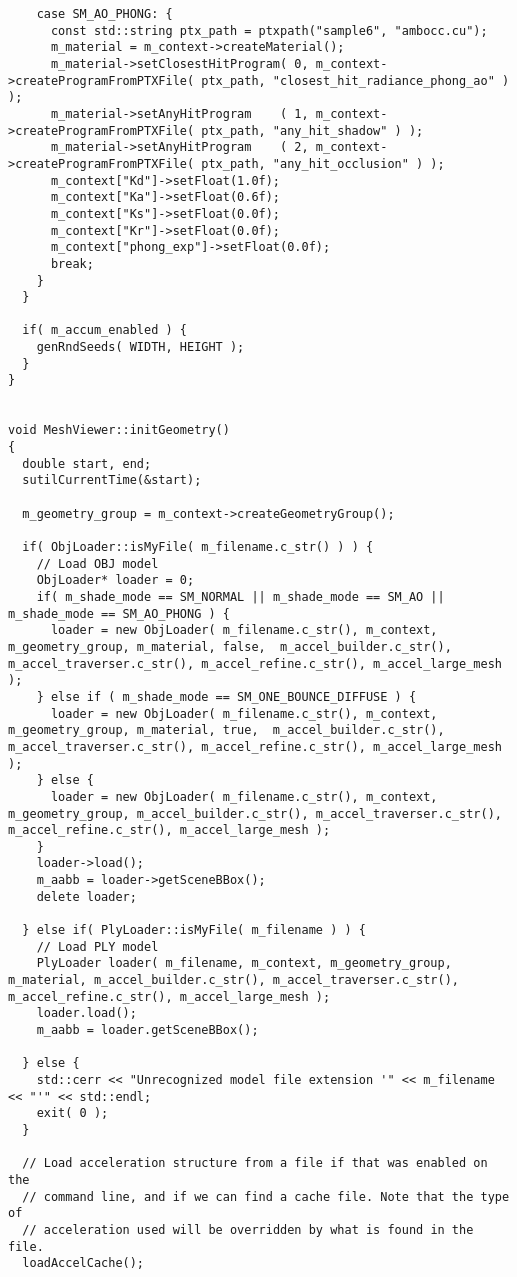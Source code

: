 \begin{verbatim}
    case SM_AO_PHONG: {
      const std::string ptx_path = ptxpath("sample6", "ambocc.cu");
      m_material = m_context->createMaterial();
      m_material->setClosestHitProgram( 0, m_context->createProgramFromPTXFile( ptx_path, "closest_hit_radiance_phong_ao" ) );
      m_material->setAnyHitProgram    ( 1, m_context->createProgramFromPTXFile( ptx_path, "any_hit_shadow" ) );
      m_material->setAnyHitProgram    ( 2, m_context->createProgramFromPTXFile( ptx_path, "any_hit_occlusion" ) );
      m_context["Kd"]->setFloat(1.0f);
      m_context["Ka"]->setFloat(0.6f);
      m_context["Ks"]->setFloat(0.0f);
      m_context["Kr"]->setFloat(0.0f);
      m_context["phong_exp"]->setFloat(0.0f);
      break;
    }
  }

  if( m_accum_enabled ) {
    genRndSeeds( WIDTH, HEIGHT );
  }
}


void MeshViewer::initGeometry()
{
  double start, end;
  sutilCurrentTime(&start);

  m_geometry_group = m_context->createGeometryGroup();

  if( ObjLoader::isMyFile( m_filename.c_str() ) ) {
    // Load OBJ model 
    ObjLoader* loader = 0;
    if( m_shade_mode == SM_NORMAL || m_shade_mode == SM_AO || m_shade_mode == SM_AO_PHONG ) {
      loader = new ObjLoader( m_filename.c_str(), m_context, m_geometry_group, m_material, false,  m_accel_builder.c_str(), m_accel_traverser.c_str(), m_accel_refine.c_str(), m_accel_large_mesh );
    } else if ( m_shade_mode == SM_ONE_BOUNCE_DIFFUSE ) {
      loader = new ObjLoader( m_filename.c_str(), m_context, m_geometry_group, m_material, true,  m_accel_builder.c_str(), m_accel_traverser.c_str(), m_accel_refine.c_str(), m_accel_large_mesh );
    } else {
      loader = new ObjLoader( m_filename.c_str(), m_context, m_geometry_group, m_accel_builder.c_str(), m_accel_traverser.c_str(), m_accel_refine.c_str(), m_accel_large_mesh );
    }
    loader->load();
    m_aabb = loader->getSceneBBox();
    delete loader;

  } else if( PlyLoader::isMyFile( m_filename ) ) {
    // Load PLY model 
    PlyLoader loader( m_filename, m_context, m_geometry_group, m_material, m_accel_builder.c_str(), m_accel_traverser.c_str(), m_accel_refine.c_str(), m_accel_large_mesh );
    loader.load();
    m_aabb = loader.getSceneBBox();

  } else {
    std::cerr << "Unrecognized model file extension '" << m_filename << "'" << std::endl;
    exit( 0 );
  }

  // Load acceleration structure from a file if that was enabled on the
  // command line, and if we can find a cache file. Note that the type of
  // acceleration used will be overridden by what is found in the file.
  loadAccelCache();


\end{verbatim}
